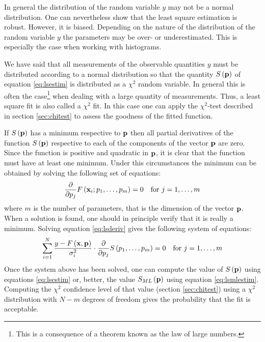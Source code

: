 \documentclass[twoside]{book}
\begin{document}
In general the distribution of the random variable $y$ may not be
a normal distribution. One can nevertheless show that the least
square estimation is robust. However, it is biased. Depending on
the nature of the distribution of the random variable $y$ the
parameters may be over- or underestimated. This is especially the
case when working with histograms.

We have said that all measurements of the observable quantities
$y$ must be distributed according to a normal distribution so that
the quantity $S\left({\bf p}\right)$ of equation \ref{eq:lsestim}
is distributed as a $\chi^2$ random variable. In general this is
often the case\footnote{This is a consequence of a theorem known
as the law of large numbers.} when dealing with a large quantity
of measurements. Thus, a least square fit is also called a
$\chi^2$ fit. In this case one can apply the $\chi^2$-test
described in section \ref{sec:chitest} to assess the goodness of
the fitted function.

If $S\left({\bf p}\right)$ has a minimum respective to ${\bf p}$
then all partial derivatives of the function $S\left({\bf
p}\right)$ respective to each of the components of the vector
${\bf p}$ are zero. Since the function is positive and quadratic
in ${\bf p}$, it is clear that the function must have at least one
minimum. Under this circumstances the minimum can be obtained by
solving the following set of equations:
\begin{equation}
\label{eq:lsderiv}
  {\displaystyle \partial\over\displaystyle\partial p_j}
  F\left({\bf x}_i;p_1,\ldots,p_m\right)=0\mbox{\quad for $j=1,\ldots,m$}
\end{equation}
where $m$ is the number of parameters, that is the dimension of
the vector ${\bf p}$. When a solution is found, one should in
principle verify that it is really a minimum. Solving equation
\ref{eq:lsderiv} gives the following system of equations:
\begin{equation}
\label{eq:lsequs}
  \sum_{i=1}^N {
  y-F\left({\bf x},{\bf p}\right)\over \sigma_i^2}\cdot
  {\displaystyle \partial\over\displaystyle\partial p_j} S\left(p_1,\ldots,p_m\right)
  =0\mbox{\quad for $j=1,\ldots,m$}
\end{equation}
Once the system above has been solved, one can compute the value
of $S\left({\bf p}\right)$ using equations \ref{eq:lsestim} or,
better, the value $S_{\mathop{ML}}\left({\bf p}\right)$ using
equation \ref{eq:lsmlestim}. Computing the $\chi^2$ confidence
level of that value (\cf section \ref{sec:chitest}) using a
$\chi^2$ distribution with $N-m$ degrees of freedom gives the
probability that the fit is acceptable.
\end{document}
